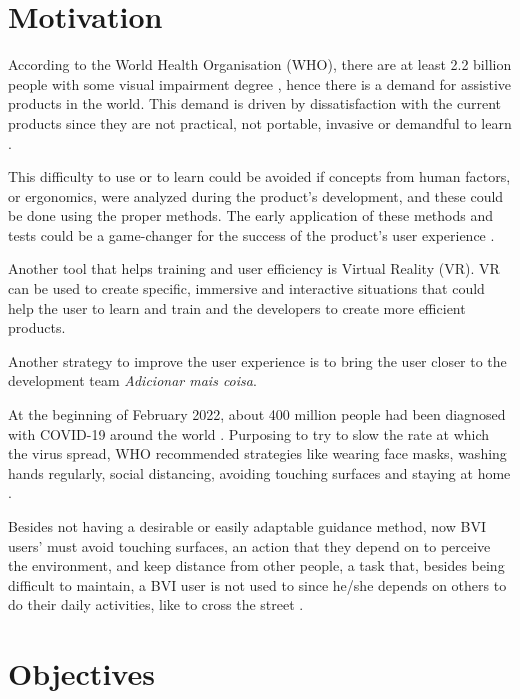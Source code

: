 \section{Motivation}


According to the World Health Organisation (WHO), there are at least 2.2 billion people with some visual impairment degree \cite{world2019world}, hence there is a demand for assistive products in the world. This demand is driven by dissatisfaction with the current products since they are not practical, not portable, invasive or demandful to learn \cite{lozano2009electrotactile}.

This difficulty to use or to learn could be avoided if concepts from human factors, or ergonomics, were analyzed during the product's development, and these could be done using the proper methods. The early application of these methods and tests could be a game-changer for the success of the product's user experience \cite{wolf2019towards}.

Another tool that helps training and user efficiency is Virtual Reality (VR). VR can be used to create specific, immersive and interactive situations that could help the user to learn and train \cite{farrell2018learning} and the developers to create more efficient products.

Another strategy to improve the user experience is to bring the user closer to the development team {\textit{\large Adicionar mais coisa}}.

At the beginning of February 2022, about 400 million people had been diagnosed with COVID-19 around the world \cite{ourworldindata_cases}. Purposing to try to slow the rate at which the virus spread, WHO recommended strategies like wearing face masks, washing hands regularly, social distancing, avoiding touching surfaces and staying at home \cite{who_2020}.

Besides not having a desirable or easily adaptable guidance method, now BVI users' must avoid touching surfaces, an action that they depend on to perceive the environment, and keep distance from other people, a task that, besides being difficult to maintain, a BVI user is not used to since he/she depends on others to do their daily activities, like to cross the street \cite{jondani2021strategies}.

\section{Objectives}

